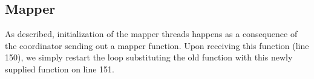 \subsection{Mapper}
As described, initialization of the mapper threads happens as a consequence of
the coordinator sending out a mapper function. Upon receiving this function
(line 150), we simply restart the loop substituting the old function with this
newly supplied function on line 151.

